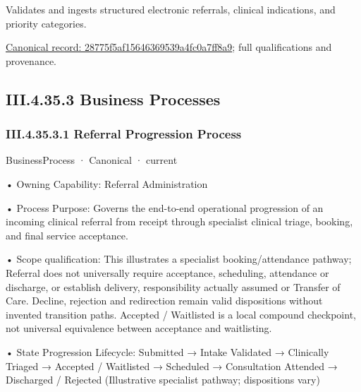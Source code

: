 Validates and ingests structured electronic referrals, clinical indications, and priority categories.


{\footnotesize \href{../../../../continuum/business/business-function/28775f5af15646369539a4fc0a7ff8a9.md}{Canonical record: 28775f5af15646369539a4fc0a7ff8a9}; full qualifications and provenance.}\par
\subsection*{III.4.35.3 Business Processes}
\label{navigation:III.4.35.3}

\subsubsection*{III.4.35.3.1 Referral Progression Process}
\label{navigation:III.4.35.3.1}

\label{element:cfb714e9320647ffa1dffc80dddd01d9}
{\small BusinessProcess · Canonical · current}\par

•
Owning Capability: Referral Administration



•
Process Purpose: Governs the end-to-end operational progression of an incoming clinical referral from receipt through specialist clinical triage, booking, and final service acceptance.



•
Scope qualification: This illustrates a specialist booking/attendance pathway; Referral does not universally require acceptance, scheduling, attendance or discharge, or establish delivery, responsibility actually assumed or Transfer of Care. Decline, rejection and redirection remain valid dispositions without invented transition paths. Accepted / Waitlisted is a local compound checkpoint, not universal equivalence between acceptance and waitlisting.



•
State Progression Lifecycle: Submitted → Intake Validated → Clinically Triaged → Accepted / Waitlisted → Scheduled → Consultation Attended → Discharged / Rejected   (Illustrative specialist pathway; dispositions vary)




